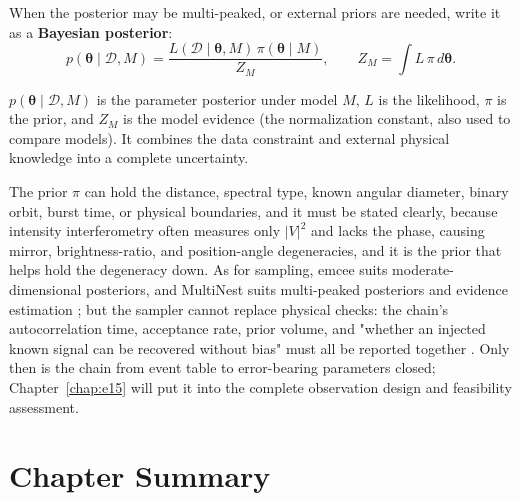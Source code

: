 When the posterior may be multi-peaked, or external priors are needed, write it as a \textbf{Bayesian posterior}:
\begin{equation}
  p(\bm\theta\mid\mathcal D,M)=\frac{L(\mathcal D\mid\bm\theta,M)\,\pi(\bm\theta\mid M)}{Z_M},
  \qquad
  Z_M=\int L\,\pi\,d\bm\theta .
  \label{eq:e14-posterior}
\end{equation}
\begin{formulaexplain}
$p(\bm\theta\mid\mathcal D,M)$ is the parameter posterior under model $M$, $L$ is the likelihood, $\pi$ is the prior, and $Z_M$ is the model evidence (the normalization constant, also used to compare models). It combines the data constraint and external physical knowledge into a complete uncertainty.
\end{formulaexplain}
The prior $\pi$ can hold the distance, spectral type, known angular diameter, binary orbit, burst time, or physical boundaries, and it must be stated clearly, because intensity interferometry often measures only $|V|^2$ and lacks the phase, causing mirror, brightness-ratio, and position-angle degeneracies, and it is the prior that helps hold the degeneracy down. As for sampling, emcee suits moderate-dimensional posteriors, and MultiNest suits multi-peaked posteriors and evidence estimation \citep{2013PASP..125..306F,2009MNRAS.398.1601F}; but the sampler cannot replace physical checks: the chain's autocorrelation time, acceptance rate, prior volume, and "whether an injected known signal can be recovered without bias" must all be reported together \citep{1992ApJ...398..146G}. Only then is the chain from event table to error-bearing parameters closed; Chapter~\ref{chap:e15} will put it into the complete observation design and feasibility assessment.

\section{Chapter Summary}
\label{sec:e14-summary}


